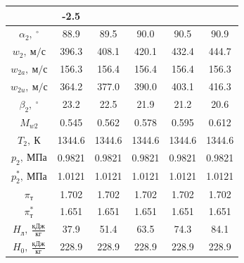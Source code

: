 \documentclass[a4paper,12pt]{article}
\begin{document}
\begin{longtable}{
    |
%    
    c|
%    
    c|
%    
    c|
%    
    c|
%    
    c|
%    
    c|
%    
    }
%        
        & -2.5
%        
        \\
        \hline
%        
        $\alpha_2,\ ^\circ$
%        
        & 88.9
%        
        & 89.5
%        
        & 90.0
%        
        & 90.5
%        
        & 90.9
%        
        \\
        \hline
%        
        $w_2,\ м/с$
%        
        & 396.3
%        
        & 408.1
%        
        & 420.1
%        
        & 432.4
%        
        & 444.7
%        
        \\
        \hline
%        
        $w_{2a},\ м/с$
%        
        & 156.3
%        
        & 156.4
%        
        & 156.4
%        
        & 156.4
%        
        & 156.3
%        
        \\
        \hline
%        
        $w_{2u},\ м/с$
%        
        & 364.2
%        
        & 377.0
%        
        & 390.0
%        
        & 403.1
%        
        & 416.3
%        
        \\
        \hline
%        
        $\beta_2,\ ^\circ$
%        
        & 23.2
%        
        & 22.5
%        
        & 21.9
%        
        & 21.2
%        
        & 20.6
%        
        \\
        \hline
%        
        $M_{w2}$
%        
        & 0.545
%        
        & 0.562
%        
        & 0.578
%        
        & 0.595
%        
        & 0.612
%        
        \\
        \hline
%        
        $T_2,\ К$
%        
        & 1344.6
%        
        & 1344.6
%        
        & 1344.6
%        
        & 1344.6
%        
        & 1344.6
%        
        \\
        \hline
%        
        $p_2,\ МПа$
%        
        & 0.9821
%        
        & 0.9821
%        
        & 0.9821
%        
        & 0.9821
%        
        & 0.9821
%        
        \\
        \hline
%        
        $p_2^*,\ МПа$
%        
        & 1.0121
%        
        & 1.0121
%        
        & 1.0121
%        
        & 1.0121
%        
        & 1.0121
%        
        \\
        \hline
%        
        $\pi_т$
%        
        & 1.702
%        
        & 1.702
%        
        & 1.702
%        
        & 1.702
%        
        & 1.702
%        
        \\
        \hline
%        
        $\pi_т^*$
%        
        & 1.651
%        
        & 1.651
%        
        & 1.651
%        
        & 1.651
%        
        & 1.651
%        
        \\
        \hline
%        
        $H_л,\ \frac{кДж}{кг}$
%        
        & 37.9
%        
        & 51.4
%        
        & 63.5
%        
        & 74.3
%        
        & 84.1
%        
        \\
        \hline
%        
        $H_0,\ \frac{кДж}{кг}$
%        
        & 228.9
%        
        & 228.9
%        
        & 228.9
%        
        & 228.9
%        
        & 228.9
%        
        \\
        \hline
%        


\end{longtable}
\end{document}
